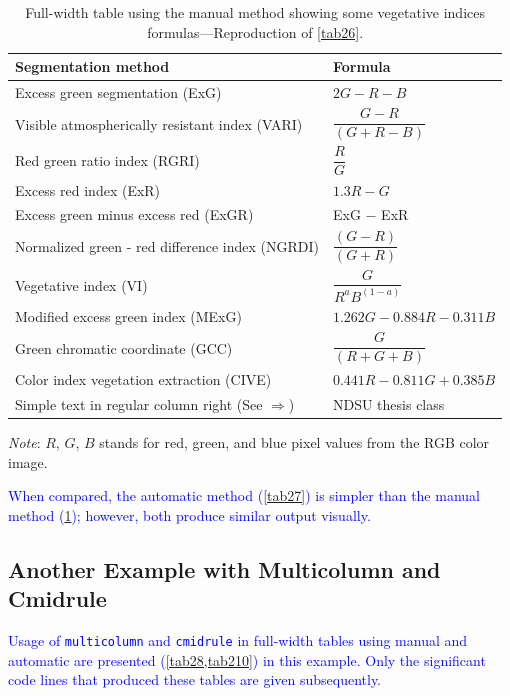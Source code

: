 \documentclass[phd]{ndsu-thesis-2022}
\newcommand\italk[1]{\textcolor{blue}{#1}}  %
\newcommand\vb[1]{\textcolor{blue}{\texttt{#1}}}%
\begin{document}
\begin{table}[t]
\caption{Full-width table using the manual method showing some vegetative indices formulas---Reproduction of \cref{tab26}.}
\setlength{\tabcolsep}{7ex}
\begin{tabular}{@{\:}l l@{\:}}
\toprule
Segmentation method  & Formula  \\
\midrule
Excess green segmentation (ExG)    				& $2G - R - B$\\[1ex]
Visible atmospherically resistant index (VARI) 		& $\dfrac{{G - R}}
{(G + R - B)}$ \\[2ex]
Red green ratio index (RGRI) 					& $\dfrac{R}{G}$\\[2ex]
Excess red index (ExR) 						& $1.3R - G$\\[2ex]
Excess green minus excess red (ExGR) 			& \text ExG $-$ ExR\\[2ex]
Normalized green - red difference index (NGRDI)	& $\dfrac{(G - R)}{(G + R)}$\\[2ex]
Vegetative index (VI) 						& $\dfrac{G}{R^a B^{(1-a)}}$\\[3ex]
Modified excess green index (MExG) 			& $ 1.262G - 0.884R - 0.311B$\\[2ex]
Green chromatic coordinate (GCC) 				& $\dfrac{G}{(R + G + B)}$\\[2ex]
Color index vegetation extraction (CIVE) 			& $0.441R - 0.811G + 0.385B$\\[2ex]
Simple text in regular column right (See $\Rightarrow$) & NDSU thesis class\\
\bottomrule
\end{tabular}
\begin{tablenotes}[flushleft]
\footnotesize
\item \hspace{-1ex} \emph{Note}: $R$, $G$, $B$ stands for red, green, and blue pixel values from the RGB color image.
\label{tab28}
\end{tablenotes}
\end{table}

\italk{When compared, the automatic method (\cref{tab27}) is simpler than the manual method (\cref{tab28}); however, both produce similar output visually.} 

\kant[9]
\subsection{Another Example with Multicolumn and Cmidrule}
\italk{Usage of \vb{multicolumn} and \vb{cmidrule} in full-width tables using manual and automatic are presented (\cref{tab28,tab210}) in this example. Only the significant code lines that produced these tables are given subsequently.} 
\end{document}
